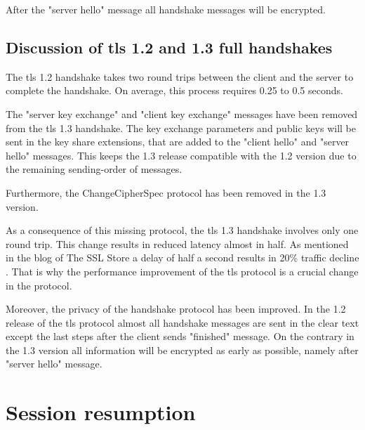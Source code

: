 After the "server hello" message all handshake messages will be encrypted.
\cite{recorla}
\subsection{Discussion of \gls{tls} 1.2 and 1.3 full handshakes}
\label{subsec:comparison_handshake}

The \gls{tls} 1.2 handshake takes two round trips between the client and the server to complete the handshake. On average, this process requires 0.25 to 0.5 seconds.

The "server key exchange" and "client key exchange" messages have been removed from the \gls{tls} 1.3 handshake. The key exchange parameters and public keys will be sent in the key share extensions, that are added to the "client hello" and "server hello" messages. This keeps the 1.3 release compatible with the 1.2 version due to the remaining sending-order of messages.

Furthermore, the ChangeCipherSpec protocol has been removed in the 1.3 version. 

As a consequence of this missing protocol, the \gls{tls} 1.3 handshake involves only one round trip. This change results in reduced latency almost in half. As mentioned in the blog of The SSL Store a delay of half a second results in 20\% traffic decline \cite{sslstore:handshake}. That is why the performance improvement of the \gls{tls} protocol is a crucial change in the protocol.

Moreover, the privacy of the handshake protocol has been improved. In the 1.2 release of the \gls{tls} protocol almost all handshake messages are sent in the clear text except the last steps after the client sends "finished" message. On the contrary in the 1.3 version all information will be encrypted as early as possible, namely after "server hello" message. 

\section{Session resumption}
\label{sec:comparison_resumption}

